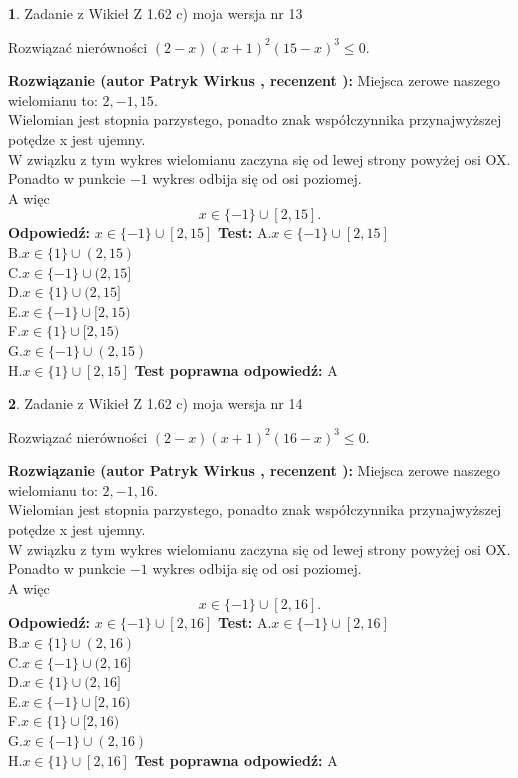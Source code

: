 \documentclass[12pt, a4paper]{article}
\theoremstyle{definition} %
\newtheorem{zad}{}
\newcommand{\zadStart}[1]{\begin{zad}#1\newline}
\newcommand{\zadStop}{\end{zad}}
\newcommand{\rozwStart}[2]{\noindent \textbf{Rozwiązanie (autor #1 , recenzent #2): }\newline}
\newcommand{\rozwStop}{\newline}
\newcommand{\odpStart}{\noindent \textbf{Odpowiedź:}\newline}
\newcommand{\odpStop}{\newline}
\newcommand{\testStart}{\noindent \textbf{Test:}\newline}
\newcommand{\testStop}{\newline}
\newcommand{\kluczStart}{\noindent \textbf{Test poprawna odpowiedź:}\newline}
\newcommand{\kluczStop}{\newline}
\begin{document}
\zadStart{Zadanie z Wikieł Z 1.62 c) moja wersja nr 13}

Rozwiązać nierówności $(2-x)(x+1)^{2}(15-x)^{3}\le0$.
\zadStop
\rozwStart{Patryk Wirkus}{}
Miejsca zerowe naszego wielomianu to: $2, -1, 15$.\\
Wielomian jest stopnia parzystego, ponadto znak współczynnika przy\linebreak najwyższej potędze x jest ujemny.\\ W związku z tym wykres wielomianu zaczyna się od lewej strony powyżej osi OX.\\
Ponadto w punkcie $-1$ wykres odbija się od osi poziomej.\\
A więc $$x \in \{-1\} \cup [2,15].$$
\rozwStop
\odpStart
$x \in \{-1\} \cup [2,15]$
\odpStop
\testStart
A.$x \in \{-1\} \cup [2,15]$\\
B.$x \in \{1\} \cup (2,15)$\\
C.$x \in \{-1\} \cup (2,15]$\\
D.$x \in \{1\} \cup (2,15]$\\
E.$x \in \{-1\} \cup [2,15)$\\
F.$x \in \{1\} \cup [2,15)$\\
G.$x \in \{-1\} \cup (2,15)$\\
H.$x \in \{1\} \cup [2,15]$
\testStop
\kluczStart
A
\kluczStop



\zadStart{Zadanie z Wikieł Z 1.62 c) moja wersja nr 14}

Rozwiązać nierówności $(2-x)(x+1)^{2}(16-x)^{3}\le0$.
\zadStop
\rozwStart{Patryk Wirkus}{}
Miejsca zerowe naszego wielomianu to: $2, -1, 16$.\\
Wielomian jest stopnia parzystego, ponadto znak współczynnika przy\linebreak najwyższej potędze x jest ujemny.\\ W związku z tym wykres wielomianu zaczyna się od lewej strony powyżej osi OX.\\
Ponadto w punkcie $-1$ wykres odbija się od osi poziomej.\\
A więc $$x \in \{-1\} \cup [2,16].$$
\rozwStop
\odpStart
$x \in \{-1\} \cup [2,16]$
\odpStop
\testStart
A.$x \in \{-1\} \cup [2,16]$\\
B.$x \in \{1\} \cup (2,16)$\\
C.$x \in \{-1\} \cup (2,16]$\\
D.$x \in \{1\} \cup (2,16]$\\
E.$x \in \{-1\} \cup [2,16)$\\
F.$x \in \{1\} \cup [2,16)$\\
G.$x \in \{-1\} \cup (2,16)$\\
H.$x \in \{1\} \cup [2,16]$
\testStop
\kluczStart
A
\kluczStop
\end{document}
